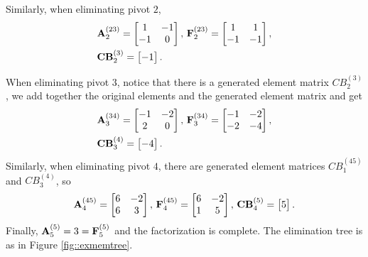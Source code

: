 \begin{exm}
    Similarly, when eliminating pivot $2$,
    \begin{align*}
        &{\mathbf{A}}_2^{(23)}=
    \begin{bmatrix}
        1&-1\\
        -1&0
    \end{bmatrix},\,
    \mathbf{F}_2^{(23)}=
    \begin{bmatrix}
        1&1\\
        -1&-1
    \end{bmatrix},\\
    &\mathbf{CB}_2^{(3)}=\begin{bmatrix}
        -1
    \end{bmatrix}.
    \end{align*}

    When eliminating pivot $3$, notice that there is a 
    generated element matrix $CB_2^{(3)}$, we add together the 
    original elements and the generated element matrix and get
    \begin{align*}
    &{\mathbf{A}}_3^{(34)}=
    \begin{bmatrix}
        -1&-2\\
        2&0
    \end{bmatrix},\,
    \mathbf{F}_3^{(34)}=
    \begin{bmatrix}
        -1&-2\\
        -2&-4
    \end{bmatrix},\\
    &\mathbf{CB}_3^{(4)}=
    \begin{bmatrix}
        -4
    \end{bmatrix}.
    \end{align*}
    Similarly, when eliminating pivot $4$, there are generated 
    element matrices $CB_1^{(45)}$ and $CB_3^{(4)}$, so
    $$
    {\mathbf{A}}_4^{(45)}=
    \begin{bmatrix}
        6&-2\\
        6&3
    \end{bmatrix},\,
    \mathbf{F}_4^{(45)}=
    \begin{bmatrix}
        6&-2\\
        1&5
    \end{bmatrix},\,
    \mathbf{CB}_4^{(5)}=
    \begin{bmatrix}
        5
    \end{bmatrix}.
    $$ 
    Finally, ${\mathbf{A}}_5^{(5)}=3=\mathbf{F}_5^{(5)}$ and the 
    factorization is complete. The elimination tree is as in 
    Figure \ref{fig::exmemtree}.
    \begin{figure}[H]

\end{figure}
\end{exm}
